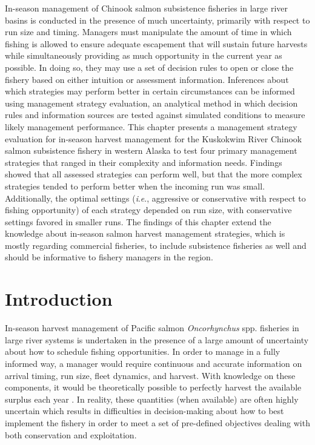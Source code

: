 \documentclass[12pt,]{book}
\theoremstyle{definition}
\theoremstyle{definition}
\theoremstyle{definition}
\theoremstyle{remark}
\begin{document}
\noindent
In-season management of Chinook salmon subsistence fisheries in large
river basins is conducted in the presence of much uncertainty, primarily
with respect to run size and timing. Managers must manipulate the amount
of time in which fishing is allowed to ensure adequate escapement that
will sustain future harvests while simultaneously providing as much
opportunity in the current year as possible. In doing so, they may use a
set of decision rules to open or close the fishery based on either
intuition or assessment information. Inferences about which strategies
may perform better in certain circumstances can be informed using
management strategy evaluation, an analytical method in which decision
rules and information sources are tested against simulated conditions to
measure likely management performance. This chapter presents a
management strategy evaluation for in-season harvest management for the
Kuskokwim River Chinook salmon subsistence fishery in western Alaska to
test four primary management strategies that ranged in their complexity
and information needs. Findings showed that all assessed strategies can
perform well, but that the more complex strategies tended to perform
better when the incoming run was small. Additionally, the optimal
settings (\emph{i}.\emph{e}., aggressive or conservative with respect to
fishing opportunity) of each strategy depended on run size, with
conservative settings favored in smaller runs. The findings of this
chapter extend the knowledge about in-season salmon harvest management
strategies, which is mostly regarding commercial fisheries, to include
subsistence fisheries as well and should be informative to fishery
managers in the region.

\section{Introduction}\label{introduction-1}

\noindent
In-season harvest management of Pacific salmon \emph{Oncorhynchus} spp.
fisheries in large river systems is undertaken in the presence of a
large amount of uncertainty about how to schedule fishing opportunities.
In order to manage in a fully informed way, a manager would require
continuous and accurate information on arrival timing, run size, fleet
dynamics, and harvest. With knowledge on these components, it would be
theoretically possible to perfectly harvest the available surplus each
year \citep{adkison-cunningham-2015}. In reality, these quantities (when
available) are often highly uncertain
\citep{adkison-peterman-2000, flynn-hilborn-2004, hyun-etal-2012} which
results in difficulties in decision-making about how to best implement
the fishery in order to meet a set of pre-defined objectives dealing
with both conservation and exploitation.
\end{document}
